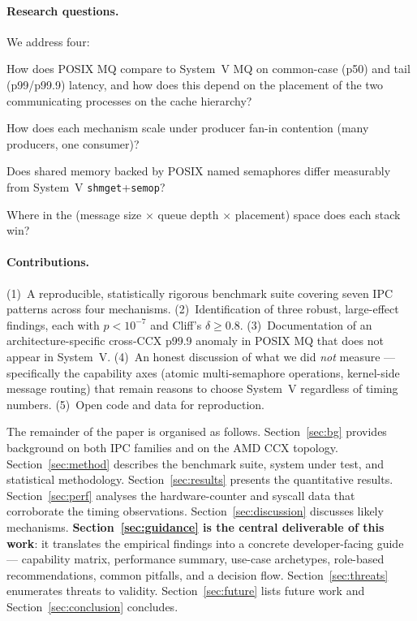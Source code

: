 \documentclass[a4paper,11pt]{article}
\begin{document}
\paragraph{Research questions.} We address four:

\begin{description}[leftmargin=*,style=nextline]
\item[RQ1.] How does POSIX MQ compare to System~V MQ on common-case (p50)
and tail (p99/p99.9) latency, and how does this depend on the placement of
the two communicating processes on the cache hierarchy?
\item[RQ2.] How does each mechanism scale under producer fan-in contention
(many producers, one consumer)?
\item[RQ3.] Does shared memory backed by POSIX named semaphores differ
measurably from System~V \texttt{shmget}+\texttt{semop}?
\item[RQ4.] Where in the (message size $\times$ queue depth $\times$
placement) space does each stack win?
\end{description}

\paragraph{Contributions.} (1)~A reproducible, statistically rigorous
benchmark suite covering seven IPC patterns across four mechanisms.
(2)~Identification of three robust, large-effect findings, each with
$p<10^{-7}$ and Cliff's $\delta\geq 0.8$. (3)~Documentation of an
architecture-specific cross-CCX p99.9 anomaly in POSIX MQ that does not
appear in System~V. (4)~An honest discussion of what we did \emph{not}
measure --- specifically the capability axes (atomic multi-semaphore
operations, kernel-side message routing) that remain reasons to choose
System~V regardless of timing numbers. (5)~Open code and data for
reproduction.

The remainder of the paper is organised as follows. Section~\ref{sec:bg}
provides background on both IPC families and on the AMD CCX topology.
Section~\ref{sec:method} describes the benchmark suite, system under test,
and statistical methodology. Section~\ref{sec:results} presents the
quantitative results. Section~\ref{sec:perf} analyses the hardware-counter
and syscall data that corroborate the timing observations.
Section~\ref{sec:discussion} discusses likely mechanisms.
\textbf{Section~\ref{sec:guidance} is the central deliverable of this
work}: it translates the empirical findings into a concrete
developer-facing guide --- capability matrix, performance summary,
use-case archetypes, role-based recommendations, common pitfalls,
and a decision flow.
Section~\ref{sec:threats} enumerates threats to validity.
Section~\ref{sec:future} lists future work and Section~\ref{sec:conclusion}
concludes.
\end{document}
